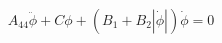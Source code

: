 \begin{equation}
A_{44} \ddot{\phi} + C \phi + \left(B_{1} + B_{2} \left|{\dot{\phi}}\right|\right) \dot{\phi} = 0
\end{equation}
